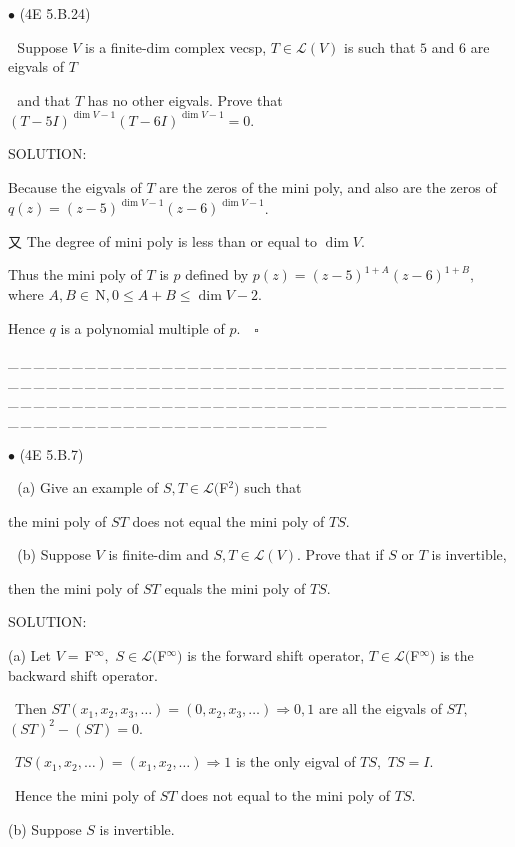 \documentclass[a4paper, 11pt, UTF8]{article}
\def\Lm{\mathcal{L}}
\def\Fbfc{$\,{\timesbf F}$}
\def\Nbfc{$\,{\timesbf N}$}
\begin{document}
\begin{large}
{\small $\bullet$} (\normalsize{4E 5.B.24})\par\,\, {\timessl\Large 
Suppose $V$ is a finite-dim complex vecsp, $T\in \Lm(V)$ is such that $5$ and $6$ are eigvals of $T$}\par\,\,
{\timessl\Large and that $T$ has no other eigvals.
Prove that $(T - 5I)^{\dim V-1} (T - 6I)^{\dim V-1} = 0$.
}\par
{\timesbf S\footnotesize{OLUTION:}}\par\quad
Because the eigvals of $T$ are the zeros of the mini poly, and also are the zeros of $q(z)=(z-5)^{\dim V-1}(z-6)^{\dim V-1}$.\par\quad
又 The degree of mini poly is less than or equal to $\dim V.$\par\quad
Thus the mini poly of $T$ is $p$ defined by $p(z)=(z-5)^{1+A} (z-6)^{1+B},$ where $A,B\in\Nbfc,0\leq A+B\leq \dim V-2.$\par\quad
Hence $q$ is a polynomial multiple of $p.\quad\square$\par
\par
{\tiny \_\,\_\,\_\,\_\,\_\,\_\,\_\,\_\,\_\,\_\,\_\,\_\,\_\,\_\,\_\,\_\,\_\,\_\,\_\,\_\,\_\,\_\,\_\,\_\,\_\,\_\,\_\,\_\,\_\,\_\,\_\,\_\,\_\,\_\,\_\,\_\,\_\,\_\,\_\,\_\,\_\,\_\,\_\,\_\,\_\,\_\,\_\,\_\,\_\,\_\,\_\,\_\,\_\,\_\,\_\,\_\,\_\,\_\,\_\,\_\,\_\,\_\,\_\,\_\,\_\,\_\,\_\,\_\,\_\,\_\,\_\_\,\_\,\_\,\_\,\_\,\_\,\_\,\_\,\_\,\_\,\_\,\_\,\_\,\_\,\_\,\_\,\_\,\_\,\_\,\_\,\_\,\_\,\_\,\_\,\_\,\_\,\_\,\_\,\_\,\_\,\_\,\_\,\_\,\_\,\_\,\_\,\_\,\_\,\_\,\_\,\_\,\_\,\_\,\_\,\_\,\_\,\_\,\_\,\_\,\_\,\_\,\_\,\_\,\_\,\_\,\_\,\_\,\_\,\_\,\_\,\_\,\_\,\_\,\_\,\_\,\_\,\_\,\_\,\_\,\_\,\_}\par


{\small $\bullet$} (\normalsize{4E 5.B.7})\par\,\,
(a) {\timessl\Large Give an example of $S, T\in\Lm(${\timesbf F}$^2)$ such that}\par\qquad
{\timessl\Large the mini poly of
$ST$ does not equal the mini poly of $TS$.}\par\,\,
(b) {\timessl\Large Suppose $V$ is finite-dim and $S, T\in\Lm(V)$. Prove that if $S$ or $T$ is invertible,}\par\qquad
{\timessl\Large then the mini poly of $ST$ equals the mini poly of $TS$.
}\par
{\timesbf S\footnotesize{OLUTION:}}\par\quad
(a) Let $V=\Fbfc^{\infty},$ $S\in\Lm(${\timesbf F}$^\infty)$ is the forward shift operator, $T\in\Lm(${\timesbf F}$^\infty)$ is the backward shift operator.\par\qquad\,
Then $ST(x_1,x_2,x_3,\dots)=(0,x_2,x_3,\dots)\Rightarrow 0,1$ are all the eigvals of $ST,$ $(ST)^2-(ST)=0.$\par\qquad\,
$TS(x_1,x_2,\dots)=(x_1,x_2,\dots)\Rightarrow 1$ is the only eigval of $TS,$ $TS=I.$\par\qquad\,
Hence the mini poly of $ST$ does not equal to the mini poly of $TS.$\par\quad
(b) Suppose $S$ is invertible.\par\qquad\,


\end{large}
\end{document}
